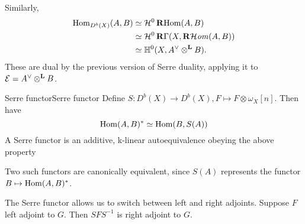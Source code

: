 Similarly,
\begin{align*}
    \operatorname{Hom}_{D^b(X)}(A,B)
        &\simeq \mathcal{H}^0\operatorname{\mathbf{R}Hom}(A,B) \\
        &\simeq \mathcal{H}^0\operatorname{\mathbf{R}\Gamma}(X,\operatorname{\mathbf{R}\mathcal{H}\mathit{om}}(A,B)) \\
        &\simeq \mathbb{H}^0(X,A^\vee\otimes^{\operatorname{\mathbf{L}}} B).
\end{align*}
These are dual by the previous version of Serre duality, applying it to $\mathcal{E}=A^\vee \otimes^{\operatorname{\mathbf{L}}} B$.

\begin{definition}{Serre functor}{Serre functor}
    Define $S:D^b(X)\rightarrow D^b(X), F\mapsto F\otimes \omega_{X}[n]$. Then have $$\operatorname{Hom}(A,B)^*\simeq \operatorname{Hom}(B,S(A))$$
     A Serre functor is an additive, k-linear autoequivalence obeying the above property
\end{definition}

Two such functors are canonically equivalent, since $S(A)$ represents the functor $B\mapsto \operatorname{Hom}(A,B)^*$.




The Serre functor allows us to switch between left and right adjoints. Suppose $F$ left adjoint to $G$. Then $SFS^{-1}$ is right adjoint to $G$.


